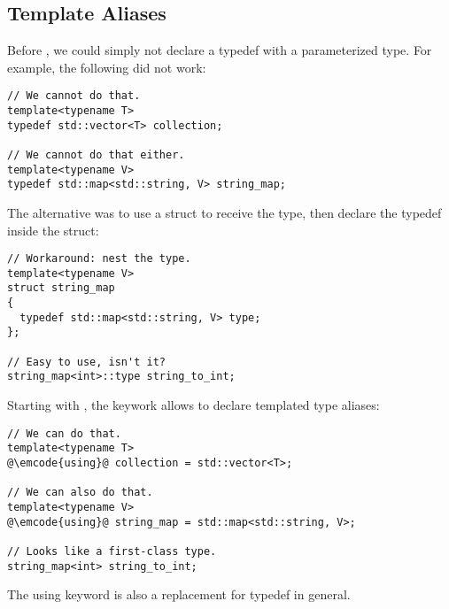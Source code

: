 \subsection{Template Aliases}

\problemtitle

Before , we could simply not declare a typedef with a
parameterized type. For example, the following did not work:

\begin{lstlisting}
// We cannot do that.
template<typename T>
typedef std::vector<T> collection;

// We cannot do that either.
template<typename V>
typedef std::map<std::string, V> string_map;
\end{lstlisting}

The alternative was to use a struct to receive the type, then declare
the typedef inside the struct:

\begin{lstlisting}
// Workaround: nest the type.
template<typename V>
struct string_map
{
  typedef std::map<std::string, V> type;
};

// Easy to use, isn't it?
string_map<int>::type string_to_int;
\end{lstlisting}

\solutiontitle

Starting with , the  keywork allows to declare
templated type aliases:

\begin{lstlisting}
// We can do that.
template<typename T>
@\emcode{using}@ collection = std::vector<T>;

// We can also do that.
template<typename V>
@\emcode{using}@ string_map = std::map<std::string, V>;

// Looks like a first-class type.
string_map<int> string_to_int;
\end{lstlisting}

The using keyword is also a replacement for typedef in general.
